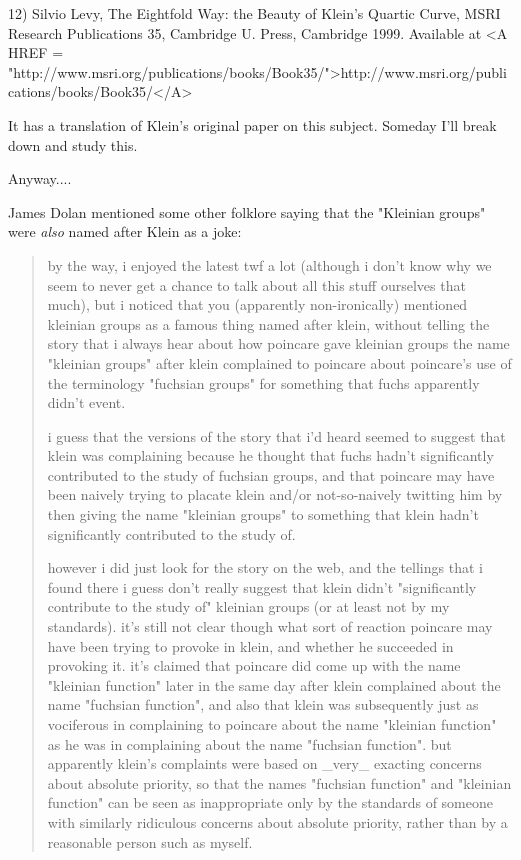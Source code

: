 12) Silvio Levy, The Eightfold Way: the Beauty of Klein's Quartic Curve,
MSRI Research Publications 35, Cambridge U. Press, Cambridge 1999.
Available at <A HREF = "http://www.msri.org/publications/books/Book35/">http://www.msri.org/publications/books/Book35/</A>

It has a translation of Klein's original paper on this subject.
Someday I'll break down and study this.

Anyway....

James Dolan mentioned some other folklore saying that the "Kleinian 
groups" were \emph{also} named after Klein as a joke:
\begin{quote}
 by the way, i enjoyed the latest twf a lot (although i don't know why
 we seem to never get a chance to talk about all this stuff ourselves
 that much), but i noticed that you (apparently non-ironically)
 mentioned kleinian groups as a famous thing named after klein, without
 telling the story that i always hear about how poincare gave kleinian
 groups the name "kleinian groups" after klein complained to poincare
 about poincare's use of the terminology "fuchsian groups" for
 something that fuchs apparently didn't event.
 
 i guess that the versions of the story that i'd heard seemed to
 suggest that klein was complaining because he thought that fuchs
 hadn't significantly contributed to the study of fuchsian groups, and
 that poincare may have been naively trying to placate klein and/or
 not-so-naively twitting him by then giving the name "kleinian groups"
 to something that klein hadn't significantly contributed to the study
 of.

 however i did just look for the story on the web, and the tellings
 that i found there i guess don't really suggest that klein didn't
 "significantly contribute to the study of" kleinian groups (or at
 least not by my standards).  it's still not clear though what sort of
 reaction poincare may have been trying to provoke in klein, and
 whether he succeeded in provoking it.  it's claimed that poincare did
 come up with the name "kleinian function" later in the same day after
 klein complained about the name "fuchsian function", and also that
 klein was subsequently just as vociferous in complaining to poincare
 about the name "kleinian function" as he was in complaining about the
 name "fuchsian function".  but apparently klein's complaints were
 based on _very_ exacting concerns about absolute priority, so that the
 names "fuchsian function" and "kleinian function" 
 can be seen as
 inappropriate only by the standards of someone with similarly
 ridiculous concerns about absolute priority, rather than by a
 reasonable person such as myself.


\end{quote}
